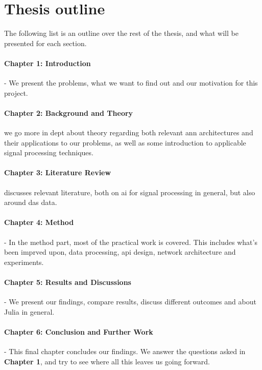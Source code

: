 \section{Thesis outline}

The following list is an outline over the rest of the thesis, and what will be presented for each section. \\

\paragraph{Chapter 1: Introduction} - We present the problems, what we want to find out and our motivation for this project. \\

\paragraph{Chapter 2: Background and Theory} we go more in dept about theory regarding both relevant \acrshort{ann} architectures and their applications to our problems, as well as some introduction to applicable signal processing techniques. 


\paragraph{Chapter 3: Literature Review} discusses relevant literature, both on \acrshort{ai} for signal processing in general, but also around \acrshort{das} data. \\

\paragraph{Chapter 4: Method} - In the method part, most of the practical work is covered. This includes what's been imprved upon, data processing, \acrshort{api} design, network architecture and experiments. \\

\paragraph{Chapter 5: Results and Discussions} - We present our findings, compare results, discuss different outcomes and about Julia in general. \\

\paragraph{Chapter 6: Conclusion and Further Work} - This final chapter concludes our findings. We answer the questions asked in \textbf{Chapter 1}, and try to see where all this leaves us going forward. \\
